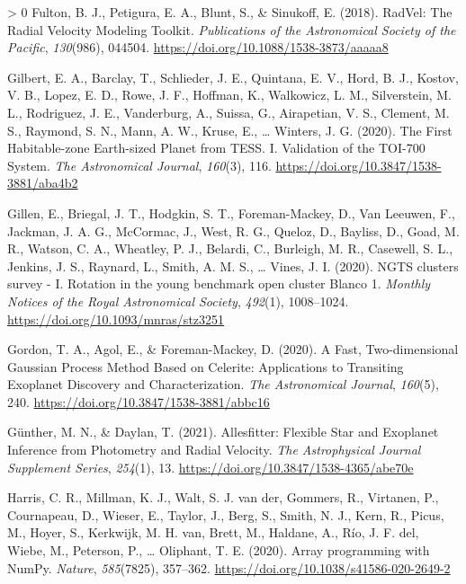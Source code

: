 \documentclass[10pt,a4paper,onecolumn]{article}
\newlength{\cslhangindent}
\newenvironment{CSLReferences}[3] %
 {%
  \setlength{\parindent}{0pt}
  \ifodd #1 \everypar{\setlength{\hangindent}{\cslhangindent}}\ignorespaces\fi
  \ifnum #2 > 0
  \setlength{\parskip}{#2\baselineskip}
  \fi
 }%
 {}
\begin{document}
\begin{CSLReferences}{1}{0}
\leavevmode\hypertarget{ref-fulton18}{}%
Fulton, B. J., Petigura, E. A., Blunt, S., \& Sinukoff, E. (2018).
{RadVel: The Radial Velocity Modeling Toolkit}. \emph{Publications of
the Astronomical Society of the Pacific}, \emph{130}(986), 044504.
\url{https://doi.org/10.1088/1538-3873/aaaaa8}

\leavevmode\hypertarget{ref-gilbert20}{}%
Gilbert, E. A., Barclay, T., Schlieder, J. E., Quintana, E. V., Hord, B.
J., Kostov, V. B., Lopez, E. D., Rowe, J. F., Hoffman, K., Walkowicz, L.
M., Silverstein, M. L., Rodriguez, J. E., Vanderburg, A., Suissa, G.,
Airapetian, V. S., Clement, M. S., Raymond, S. N., Mann, A. W., Kruse,
E., \ldots{} Winters, J. G. (2020). {The First Habitable-zone
Earth-sized Planet from TESS. I. Validation of the TOI-700 System}.
\emph{The Astronomical Journal}, \emph{160}(3), 116.
\url{https://doi.org/10.3847/1538-3881/aba4b2}

\leavevmode\hypertarget{ref-gillen20}{}%
Gillen, E., Briegal, J. T., Hodgkin, S. T., Foreman-Mackey, D., Van
Leeuwen, F., Jackman, J. A. G., McCormac, J., West, R. G., Queloz, D.,
Bayliss, D., Goad, M. R., Watson, C. A., Wheatley, P. J., Belardi, C.,
Burleigh, M. R., Casewell, S. L., Jenkins, J. S., Raynard, L., Smith, A.
M. S., \ldots{} Vines, J. I. (2020). {NGTS clusters survey - I. Rotation
in the young benchmark open cluster Blanco 1}. \emph{Monthly Notices of
the Royal Astronomical Society}, \emph{492}(1), 1008--1024.
\url{https://doi.org/10.1093/mnras/stz3251}

\leavevmode\hypertarget{ref-gordon20}{}%
Gordon, T. A., Agol, E., \& Foreman-Mackey, D. (2020). {A Fast,
Two-dimensional Gaussian Process Method Based on Celerite: Applications
to Transiting Exoplanet Discovery and Characterization}. \emph{The
Astronomical Journal}, \emph{160}(5), 240.
\url{https://doi.org/10.3847/1538-3881/abbc16}

\leavevmode\hypertarget{ref-guenther20}{}%
Günther, M. N., \& Daylan, T. (2021). {Allesfitter: Flexible Star and
Exoplanet Inference from Photometry and Radial Velocity}. \emph{The
Astrophysical Journal Supplement Series}, \emph{254}(1), 13.
\url{https://doi.org/10.3847/1538-4365/abe70e}

\leavevmode\hypertarget{ref-numpy}{}%
Harris, C. R., Millman, K. J., Walt, S. J. van der, Gommers, R.,
Virtanen, P., Cournapeau, D., Wieser, E., Taylor, J., Berg, S., Smith,
N. J., Kern, R., Picus, M., Hoyer, S., Kerkwijk, M. H. van, Brett, M.,
Haldane, A., Río, J. F. del, Wiebe, M., Peterson, P., \ldots{} Oliphant,
T. E. (2020). Array programming with {NumPy}. \emph{Nature},
\emph{585}(7825), 357--362.
\url{https://doi.org/10.1038/s41586-020-2649-2}


\end{CSLReferences}
\end{document}
